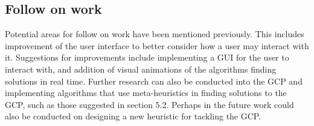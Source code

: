 \subsection{Follow on work}
Potential areas for follow on work have been mentioned previously. This includes improvement of the user interface to better consider how a user may interact with it. Suggestions for improvements include implementing a GUI for the user to interact with, and addition of visual animations of the algorithms finding solutions in real time. Further research can also be conducted into the GCP and implementing algorithms that use meta-heuristics in finding solutions to the GCP, such as those suggested in section 5.2. Perhaps in the future work could also be conducted on designing a new heuristic for tackling the GCP. 
